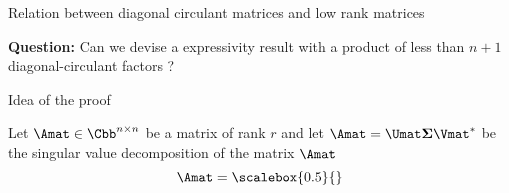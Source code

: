\begin{frame}{Relation between diagonal circulant matrices and low rank matrices}

  \begin{minipage}{\textwidth}
    \textbf{Question:} Can we devise a expressivity result with a product of less than $n + 1$ diagonal-circulant factors ?
  \end{minipage}



\end{frame}


\begin{frame}{Idea of the proof}

  Let $\Amat \in \Cbb^{n \times n}$ be a matrix of rank $r$ and let $\Amat = \Umat \boldsymbol{\Sigma} \Vmat^*$ be the singular value decomposition of the matrix $\Amat$
  \begin{equation*}
    \Amat = \scalebox{0.5}{}
  \end{equation*}


\end{frame}



